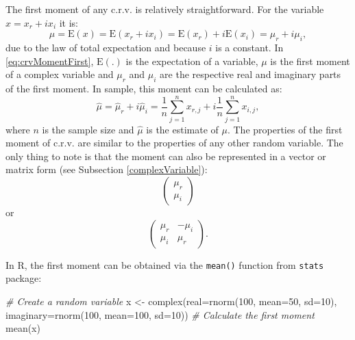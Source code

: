 \documentclass[
]{book}
\newenvironment{Shaded}{\begin{snugshade}}{\end{snugshade}}
\newcommand{\AttributeTok}[1]{\textcolor[rgb]{0.77,0.63,0.00}{#1}}
\newcommand{\CommentTok}[1]{\textcolor[rgb]{0.56,0.35,0.01}{\textit{#1}}}
\newcommand{\DecValTok}[1]{\textcolor[rgb]{0.00,0.00,0.81}{#1}}
\newcommand{\FunctionTok}[1]{\textcolor[rgb]{0.00,0.00,0.00}{#1}}
\newcommand{\NormalTok}[1]{#1}
\newcommand{\OtherTok}[1]{\textcolor[rgb]{0.56,0.35,0.01}{#1}}
\begin{document}
The first moment of any c.r.v. is relatively straightforward. For the variable \(x=x_r+ix_i\) it is:
\begin{equation}
    \mu = \mathrm{E}(x) = \mathrm{E}(x_r + i x_i) = \mathrm{E}(x_r) + i \mathrm{E}(x_i) = \mu_{r} + i \mu_{i},
    \label{eq:crvMomentFirst}
\end{equation}
due to the law of total expectation and because \(i\) is a constant. In \eqref{eq:crvMomentFirst}, \(\mathrm{E}(.)\) is the expectation of a variable, \(\mu\) is the first moment of a complex variable and \(\mu_{r}\) and \(\mu_{i}\) are the respective real and imaginary parts of the first moment. In sample, this moment can be calculated as:
\begin{equation}
    \hat{\mu} = \hat{\mu}_{r} + i \hat{\mu}_{i} = \frac{1}{n}\sum_{j=1}^n x_{r,j} + i \frac{1}{n}\sum_{j=1}^n x_{i,j},
    \label{eq:crvMomentFirstSample}
\end{equation}
where \(n\) is the sample size and \(\hat{\mu}\) is the estimate of \(\mu\). The properties of the first moment of c.r.v. are similar to the properties of any other random variable. The only thing to note is that the moment can also be represented in a vector or matrix form (see Subsection \ref{complexVariable}):
\begin{equation}
    \begin{pmatrix} \mu_{r} \\ \mu_{i} \end{pmatrix} 
    \label{eq:crvMomentsVector}
\end{equation}
or
\begin{equation}
    \begin{pmatrix} \mu_{r} & - \mu_{i} \\ \mu_{i} & \mu_{r} \end{pmatrix} .
    \label{eq:crvMomentsMatrix}
\end{equation}

In R, the first moment can be obtained via the \texttt{mean()} function from \texttt{stats} package:

\begin{Shaded}
\begin{Highlighting}[]
\CommentTok{\# Create a random variable}
\NormalTok{x }\OtherTok{\textless{}{-}} \FunctionTok{complex}\NormalTok{(}\AttributeTok{real=}\FunctionTok{rnorm}\NormalTok{(}\DecValTok{100}\NormalTok{, }\AttributeTok{mean=}\DecValTok{50}\NormalTok{, }\AttributeTok{sd=}\DecValTok{10}\NormalTok{),}
             \AttributeTok{imaginary=}\FunctionTok{rnorm}\NormalTok{(}\DecValTok{100}\NormalTok{, }\AttributeTok{mean=}\DecValTok{100}\NormalTok{, }\AttributeTok{sd=}\DecValTok{10}\NormalTok{))}
\CommentTok{\# Calculate the first moment}
\FunctionTok{mean}\NormalTok{(x)}
\end{Highlighting}
\end{Shaded}
\end{document}
